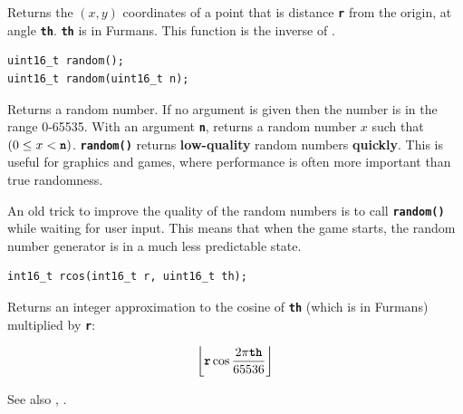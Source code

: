 \documentclass[10pt]{book}
\newcommand{\mach}[1]{\texttt{\textbf{#1}}}
\begin{document}
\begin{CJK}{UTF8}{gkai}
\begin{center}
\end{center}

Returns the $(x,y)$ coordinates of a point that is distance \mach{r} from the origin,
at angle \mach{th}.
\mach{th} is in Furmans.
This function is the inverse of .


\begin{framed}
\begin{verbatim}
uint16_t random();
uint16_t random(uint16_t n);
\end{verbatim}
\end{framed}

Returns a random number. If no argument is given then the number is in the range 0-65535.
With an argument \mach{n}, returns a random number $x$ such that $(0 \le x < \mach{n})$.
\mach{random()} returns \textbf{low-quality} random numbers \textbf{quickly}.
This is useful for graphics and games, where performance is often more important than true randomness.

An old trick to improve the quality of the random numbers is to call \mach{random()} while waiting 
for user input.
This means that when the game starts, the random number generator is in a much less predictable state.

\newpage
{}

\begin{framed}
\begin{verbatim}
int16_t rcos(int16_t r, uint16_t th);
\end{verbatim}
\end{framed}

Returns an integer approximation to the cosine of \mach{th} (which is in Furmans) multiplied by \mach{r}:

\[
  \left\lfloor \mach{r} \cos \frac{2 \pi \mach{th}}{65536} \right\rfloor
\]

\noindent
See also , .


\end{CJK}
\end{document}

